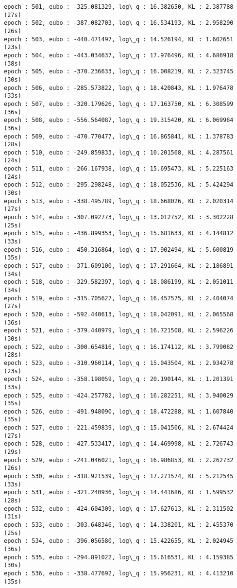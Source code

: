 \documentclass[11pt]{article}
\begin{document}
\begin{Verbatim}[commandchars=\\\{\}]
epoch : 501, eubo : -325.081329, log\_q : 16.382650, KL : 2.387788 (27s)
epoch : 502, eubo : -387.082703, log\_q : 16.534193, KL : 2.958290 (26s)
epoch : 503, eubo : -440.471497, log\_q : 14.526194, KL : 1.602651 (23s)
epoch : 504, eubo : -443.034637, log\_q : 17.976496, KL : 4.686918 (38s)
epoch : 505, eubo : -370.236633, log\_q : 16.008219, KL : 2.323745 (30s)
epoch : 506, eubo : -285.573822, log\_q : 18.420843, KL : 1.976478 (33s)
epoch : 507, eubo : -320.179626, log\_q : 17.163750, KL : 6.308599 (36s)
epoch : 508, eubo : -556.564087, log\_q : 19.315420, KL : 6.069984 (36s)
epoch : 509, eubo : -470.770477, log\_q : 16.865841, KL : 1.378783 (28s)
epoch : 510, eubo : -249.859833, log\_q : 10.201568, KL : 4.287561 (24s)
epoch : 511, eubo : -266.167938, log\_q : 15.695473, KL : 5.225163 (24s)
epoch : 512, eubo : -295.298248, log\_q : 18.052536, KL : 5.424294 (30s)
epoch : 513, eubo : -338.495789, log\_q : 18.668026, KL : 2.020314 (27s)
epoch : 514, eubo : -307.092773, log\_q : 13.012752, KL : 3.302228 (25s)
epoch : 515, eubo : -436.899353, log\_q : 15.681633, KL : 4.144812 (33s)
epoch : 516, eubo : -450.316864, log\_q : 17.902494, KL : 5.600819 (35s)
epoch : 517, eubo : -371.609100, log\_q : 17.291664, KL : 2.186891 (34s)
epoch : 518, eubo : -329.582397, log\_q : 18.086199, KL : 2.051011 (34s)
epoch : 519, eubo : -315.705627, log\_q : 16.457575, KL : 2.404074 (27s)
epoch : 520, eubo : -592.440613, log\_q : 18.042091, KL : 2.065568 (36s)
epoch : 521, eubo : -379.440979, log\_q : 16.721508, KL : 2.596226 (30s)
epoch : 522, eubo : -300.654816, log\_q : 16.174112, KL : 3.799082 (28s)
epoch : 523, eubo : -310.960114, log\_q : 15.043504, KL : 2.934278 (23s)
epoch : 524, eubo : -358.198059, log\_q : 20.190144, KL : 1.201391 (33s)
epoch : 525, eubo : -424.257782, log\_q : 16.282251, KL : 3.940029 (35s)
epoch : 526, eubo : -491.948090, log\_q : 18.472288, KL : 1.607840 (35s)
epoch : 527, eubo : -221.459839, log\_q : 15.041506, KL : 2.674424 (27s)
epoch : 528, eubo : -427.533417, log\_q : 14.469998, KL : 2.726743 (29s)
epoch : 529, eubo : -241.046021, log\_q : 16.986853, KL : 2.262732 (26s)
epoch : 530, eubo : -318.921539, log\_q : 17.271574, KL : 5.212545 (33s)
epoch : 531, eubo : -321.240936, log\_q : 14.441686, KL : 1.599532 (28s)
epoch : 532, eubo : -424.604309, log\_q : 17.627613, KL : 2.311502 (31s)
epoch : 533, eubo : -303.648346, log\_q : 14.338201, KL : 2.455370 (25s)
epoch : 534, eubo : -396.056580, log\_q : 15.422655, KL : 2.024945 (36s)
epoch : 535, eubo : -294.891022, log\_q : 15.616531, KL : 4.159385 (30s)
epoch : 536, eubo : -338.477692, log\_q : 15.956231, KL : 4.413210 (35s)

\end{Verbatim}
\end{document}
